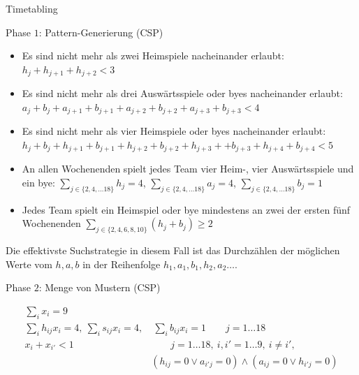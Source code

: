 \documentclass[hyperref={pdfpagelabels=false}]{beamer}
\begin{document}
\begin{frame}[allowframebreaks]{Timetabling}
\begin{block}{Phase $1$: Pattern-Generierung (CSP)}
\begin{itemize}
\item Es sind nicht mehr als zwei Heimspiele nacheinander erlaubt:\\ $h_{j}+h_{j+1}+h_{j+2}<3$ 
\end{itemize}
\end{block}

\newpage

\begin{block}{}
\begin{itemize}
\item Es sind nicht mehr als drei Auswärtsspiele oder byes  nacheinander erlaubt: \\
$a_j+b_j+a_{j+1}+b_{j+1}+a_{j+2}+b_{j+2}+a_{j+3}+b_{j+3}<4$ 

\item Es sind nicht mehr als vier Heimspiele oder byes nacheinander erlaubt:\\
$h_j+b_j+h_{j+1}+b_{j+1}+h_{j+2}+b_{j+2} +h_{j+3} ++b_{j+3} +h_{j+4}+b_{j+4} <5 $

\item An allen Wochenenden spielt jedes Team vier Heim-, vier Auswärtsspiele und ein bye:   $\sum_{j\in\{2,4,\dots 18\}}h_j = 4$, $\sum_{j\in\{2,4,\dots 18\}}a_j = 4$, $\sum_{j\in\{2,4,\dots 18\}}b_j = 1$

\item Jedes Team spielt ein Heimspiel oder bye mindestens an zwei der ersten fünf Wochenenden $\sum_{j\in\{2,4,6,8,10\}}(h_j+b_j) \ge 2$
\end{itemize}
\end{block}

Die effektivste Suchstrategie in diesem Fall ist das Durchzählen der möglichen Werte vom $h,a,b$ in der Reihenfolge $h_1,a_1,b_1,h_2,a_2\dots$.


\begin{block}{Phase $2$:  Menge von Mustern (CSP)}

\begin{align}
  \sum_{i}x_i=9 &  \nonumber \\
  \sum_{i}h_{ij}x_i = 4,\ \sum_{i}s_{ij}x_i = 4, &\ \sum_{i}b_{ij}x_i = 1 \qquad  j=1\dots 18 \nonumber \\
  x_i+x_{i'} <1  &\qquad  j=1\dots 18,\ i,i'=1\dots 9,\ i\not=i', \nonumber\\
  & (h_{ij}=0 \vee a_{i'j}=0)\wedge(a_{ij}=0 \vee h_{i'j}=0) \nonumber  
\end{align}
\end{block}

\newpage


\end{frame}
\end{document}
